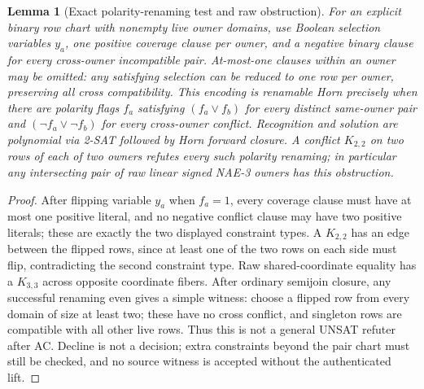 \documentclass[11pt]{article}
\newtheorem{lemma}[theorem]{Lemma}
\begin{document}
\begin{lemma}[Exact polarity-renaming test and raw obstruction]\label{lem:dr19-rename}
For an explicit binary row chart with nonempty live owner domains, use Boolean selection variables $y_a$, one positive coverage clause per owner, and a negative binary clause for every cross-owner incompatible pair. At-most-one clauses within an owner may be omitted: any satisfying selection can be reduced to one row per owner, preserving all cross compatibility. This encoding is renamable Horn precisely when there are polarity flags $f_a$ satisfying $(f_a\lor f_b)$ for every distinct same-owner pair and $(\neg f_a\lor\neg f_b)$ for every cross-owner conflict. Recognition and solution are polynomial via 2-SAT followed by Horn forward closure. A conflict $K_{2,2}$ on two rows of each of two owners refutes every such polarity renaming; in particular any intersecting pair of raw linear signed NAE-3 owners has this obstruction.
\end{lemma}
\begin{proof}
After flipping variable $y_a$ when $f_a=1$, every coverage clause must have at most one positive literal, and no negative conflict clause may have two positive literals; these are exactly the two displayed constraint types. A $K_{2,2}$ has an edge between the flipped rows, since at least one of the two rows on each side must flip, contradicting the second constraint type. Raw shared-coordinate equality has a $K_{3,3}$ across opposite coordinate fibers. After ordinary semijoin closure, any successful renaming even gives a simple witness: choose a flipped row from every domain of size at least two; these have no cross conflict, and singleton rows are compatible with all other live rows. Thus this is not a general UNSAT refuter after AC. Decline is not a decision; extra constraints beyond the pair chart must still be checked, and no source witness is accepted without the authenticated lift.
\end{proof}
\end{document}
